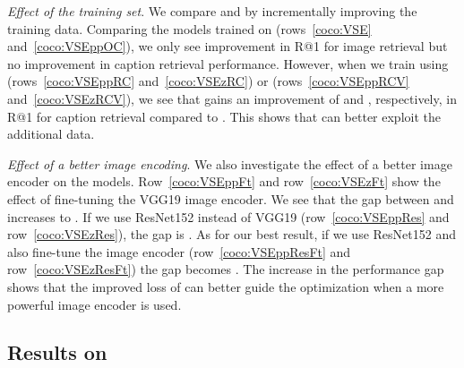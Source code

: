 \emph{Effect of the training set}. We compare \VSEz{} and \VSEpp{} by 
incrementally improving the training data.  Comparing the models trained on 
\OC{} (rows~\ref{coco:VSE} and~\ref{coco:VSEppOC}), we only see  
improvement in R@1 for image retrieval but no improvement in caption retrieval 
performance. However, when we train using \RC{} (rows~\ref{coco:VSEppRC} 
and~\ref{coco:VSEzRC}) or \RCV{} (rows~\ref{coco:VSEppRCV} 
and~\ref{coco:VSEzRCV}), we see that \VSEpp{} gains an improvement of  
and , respectively,  in R@1 for caption retrieval compared to \VSEz{}.  
This shows that \VSEpp{} can better exploit the additional data.

\emph{Effect of a better image encoding}. We also investigate the effect of 
a better image encoder on the models.  Row~\ref{coco:VSEppFt} and 
row~\ref{coco:VSEzFt} show the effect of fine-tuning the VGG19 image encoder. 
We see that the gap between \VSEz{} and \VSEpp{} increases to . If we 
use ResNet152 instead of VGG19 (row~\ref{coco:VSEppRes} and 
row~\ref{coco:VSEzRes}), the gap is . As for our best result, if we use 
ResNet152 and also fine-tune the image encoder (row~\ref{coco:VSEppResFt} and 
row~\ref{coco:VSEzResFt}) the gap becomes . The increase in the 
performance gap shows that the improved loss of \VSEpp{} can better guide the 
optimization when a more powerful image encoder is used.

\subsection{Results on \fthk{}}

